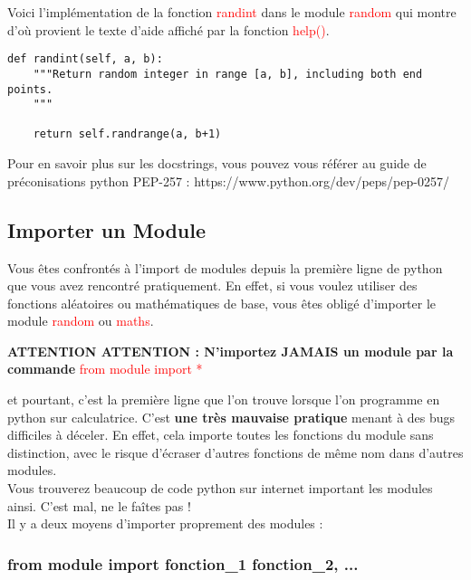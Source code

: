 \documentclass[12pt,fleqn]{book} %
\begin{document}
Voici l'implémentation de la fonction \textcolor{red}{randint} dans le module \textcolor{red}{random} qui montre d'où provient le texte d'aide affiché par la fonction \textcolor{red}{help()}.


\begin{center}
	\begin{varwidth}[t]{.5\textwidth}
		\begin{lstlisting}[language=iPython,linewidth = 15cm]
def randint(self, a, b):
	"""Return random integer in range [a, b], including both end points.
	"""

	return self.randrange(a, b+1)\end{lstlisting}
\end{varwidth}\end{center}


Pour en savoir plus sur les docstrings, vous pouvez vous référer au guide de préconisations python PEP-257 : https://www.python.org/dev/peps/pep-0257/


\subsection{Importer un Module}

Vous êtes confrontés à l'import de modules depuis la première ligne de python que vous avez rencontré pratiquement. En effet, si vous voulez utiliser des fonctions aléatoires ou mathématiques de base, vous êtes obligé d'importer le module \textcolor{red}{random} ou \textcolor{red}{maths}.

\begin{remark}
	\textbf{ATTENTION ATTENTION : N'importez JAMAIS un module par la commande} \textcolor{red}{from module import *}
\end{remark}


et pourtant, c'est la première ligne que l'on trouve lorsque l'on programme en python sur calculatrice. C'est \textbf{une très mauvaise pratique} menant à des bugs difficiles à déceler. En effet, cela importe toutes les fonctions du module sans distinction, avec le risque d'écraser d'autres fonctions de même nom dans d'autres modules. \\

Vous trouverez beaucoup de code python sur internet important les modules ainsi. C'est mal, ne le faîtes pas ! \\

Il y a deux moyens d'importer proprement des modules :

\subsubsection{from module import fonction\_1 fonction\_2, ...}
\end{document}
